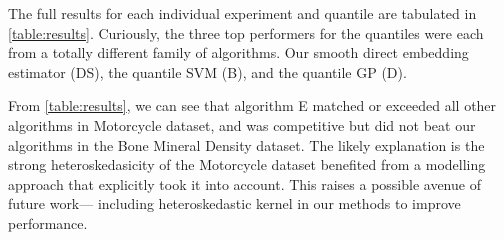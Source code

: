\documentclass[twoside]{article} \usepackage{aistats2017}
\theoremstyle{definition}
\theoremstyle{theorem}
\begin{document}
		The full results for each individual experiment and quantile are tabulated in \cref{table:results}. Curiously, the three top performers for the quantiles were each from a totally different family of algorithms. Our smooth direct embedding estimator (DS), the quantile SVM (B), and the quantile GP (D).
		
		From \cref{table:results}, we can see that algorithm E matched or exceeded all other algorithms in Motorcycle dataset, and was competitive but did not beat our algorithms in the Bone Mineral Density dataset. The likely explanation is the strong heteroskedasicity of the Motorcycle dataset benefited from a modelling approach that explicitly took it into account. This raises a possible avenue of future work--- including heteroskedastic kernel in our methods to improve performance.


\end{document}
